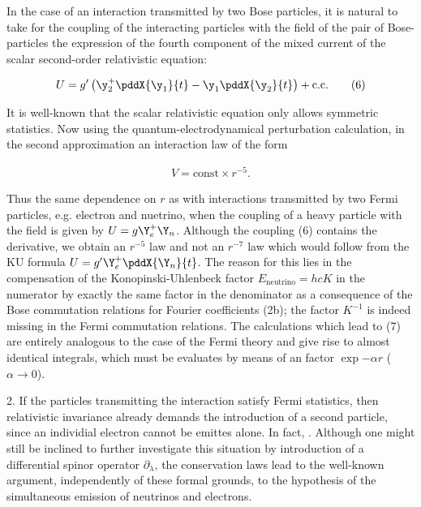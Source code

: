 \documentclass{article}
\newcommand{\nequ}[2]{
\begin{align*}
#1
\tag{#2}
\end{align*}
}
\begin{document}
In the case of an interaction transmitted by two Bose particles, it is natural to take for the coupling of the interacting particles with the field of the pair of Bose-particles the expression of the fourth component of the mixed current of the scalar second-order relativistic equation:
\nequ{
U = g'\left(\y_2^+\pddX{\y_1}{t} - \y_1\pddX{\y_2}{t}\right) + \text{c.c.}
}{6}
It is well-known that the scalar relativistic equation only allows symmetric statistics. Now using the quantum-electrodynamical perturbation calculation, in the second approximation an interaction law of the form
\nequ{
V = \text{const}\times r^{-5}.
}{7}
Thus the same dependence on $r$ as with interactions transmitted by two Fermi particles, e.g. electron and nuetrino, when the coupling of a heavy particle with the field is given by $U=g\Y^+_e \Y_n$. Although the coupling (6) contains the derivative, we obtain an $r^{-5}$ law and not an $r^{-7}$ law which would follow from the KU formula $U=g'\Y^+_e\pddX{\Y_n}{t}$. The reason for this lies in the compensation of the Konopinski-Uhlenbeck factor $E_\text{neutrino} = hcK$ in the numerator by exactly the same factor in the denominator as a consequence of the Bose commutation relations for Fourier coefficients (2b); the factor $K^{-1}$ is indeed missing in the Fermi commutation relations. The calculations which lead to (7) are entirely analogous to the case of the Fermi theory and give rise to almost identical integrals, which must be evaluates by means of an  factor $\exp{-\alpha r}$ ($\alpha \to 0$).

2. If the particles transmitting the interaction satisfy Fermi statistics, then relativistic invariance already demands the introduction of a second particle, since an individial electron cannot be emittes alone. In fact, . Although one might still be inclined to further investigate this situation by introduction of a differential spinor operator $\partial_\lambda$, the conservation laws lead to the well-known argument, independently of these formal grounds, to the hypothesis of the simultaneous emission of neutrinos and electrons.
\end{document}
